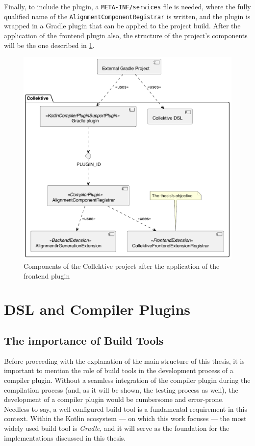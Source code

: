 \documentclass[12pt,a4paper,openright,twoside]{book}
\begin{document}
Finally, to include the plugin, a \lstinline{META-INF/services} file is needed,
where the fully qualified name of the \lstinline{AlignmentComponentRegistrar} is
written, and the plugin is wrapped in a Gradle plugin that can be applied to the
project build. After the application of the frontend plugin also, the structure
of the project's components will be the one described in
\cref{fig:collektive-components-diagram}.

\begin{figure}
  \centering
  \includegraphics[width=.6\linewidth]{figures/collektive-components.pdf}
  \caption{Components of the Collektive project after the application of the frontend plugin}
  \label{fig:collektive-components-diagram}
\end{figure}

\section{DSL and Compiler Plugins}


\subsection{The importance of Build Tools}

Before proceeding with the explanation of the main structure of this thesis, it
is important to mention the role of build tools in the development process of a
compiler plugin. Without a seamless integration of the compiler plugin during
the compilation process (and, as it will be shown, the testing process as well), the
development of a compiler plugin would be cumbersome and error-prone. 
%
Needless to say, a well-configured build tool is a fundamental requirement in
this context. Within the Kotlin ecosystem — on which this work focuses — the most
widely used build tool is \emph{Gradle}, and it will serve as the foundation for
the implementations discussed in this thesis.
\end{document}
